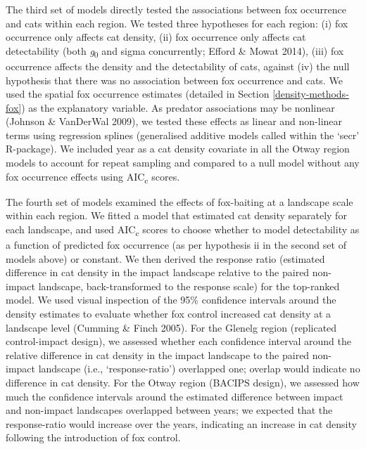 \documentclass[]{elsarticle} %
\begin{document}
The third set of models directly tested the associations between fox occurrence and cats within each region. We tested three hypotheses for each region: (i) fox occurrence only affects cat density, (ii) fox occurrence only affects cat detectability (both \emph{g}\textsubscript{0} and sigma concurrently; Efford \& Mowat 2014), (iii) fox occurrence affects the density and the detectability of cats, against (iv) the null hypothesis that there was no association between fox occurrence and cats. We used the spatial fox occurrence estimates (detailed in Section \ref{density-methods-fox}) as the explanatory variable. As predator associations may be nonlinear (Johnson \& VanDerWal 2009), we tested these effects as linear and non-linear terms using regression splines (generalised additive models called within the `secr' R-package). We included year as a cat density covariate in all the Otway region models to account for repeat sampling and compared to a null model without any fox occurrence effects using AIC\textsubscript{c} scores.

The fourth set of models examined the effects of fox-baiting at a landscape scale within each region. We fitted a model that estimated cat density separately for each landscape, and used AIC\textsubscript{c} scores to choose whether to model detectability as a function of predicted fox occurrence (as per hypothesis ii in the second set of models above) or constant. We then derived the response ratio (estimated difference in cat density in the impact landscape relative to the paired non-impact landscape, back-transformed to the response scale) for the top-ranked model. We used visual inspection of the 95\% confidence intervals around the density estimates to evaluate whether fox control increased cat density at a landscape level (Cumming \& Finch 2005). For the Glenelg region (replicated control-impact design), we assessed whether each confidence interval around the relative difference in cat density in the impact landscape to the paired non-impact landscape (i.e., `response-ratio') overlapped one; overlap would indicate no difference in cat density. For the Otway region (BACIPS design), we assessed how much the confidence intervals around the estimated difference between impact and non-impact landscapes overlapped between years; we expected that the response-ratio would increase over the years, indicating an increase in cat density following the introduction of fox control.

\newpage
\end{document}
